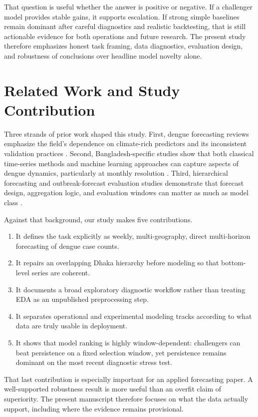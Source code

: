 \documentclass[11pt]{article}
\begin{document}
That question is useful whether the answer is positive or negative. If a challenger model provides stable gains, it supports escalation. If strong simple baselines remain dominant after careful diagnostics and realistic backtesting, that is still actionable evidence for both operations and future research. The present study therefore emphasizes honest task framing, data diagnostics, evaluation design, and robustness of conclusions over headline model novelty alone.

\section{Related Work and Study Contribution}
Three strands of prior work shaped this study. First, dengue forecasting reviews emphasize the field's dependence on climate-rich predictors and its inconsistent validation practices \citep{leung2023systematic}. Second, Bangladesh-specific studies show that both classical time-series methods and machine learning approaches can capture aspects of dengue dynamics, particularly at monthly resolution \citep{naher2022forecasting,liu2025comparative}. Third, hierarchical forecasting and outbreak-forecast evaluation studies demonstrate that forecast design, aggregation logic, and evaluation windows can matter as much as model class \citep{hyndman2011optimal,hyndman2021forecasting,cramer2022evaluation}.

Against that background, our study makes five contributions.
\begin{enumerate}
    \item It defines the task explicitly as weekly, multi-geography, direct multi-horizon forecasting of dengue case counts.
    \item It repairs an overlapping Dhaka hierarchy before modeling so that bottom-level series are coherent.
    \item It documents a broad exploratory diagnostic workflow rather than treating EDA as an unpublished preprocessing step.
    \item It separates operational and experimental modeling tracks according to what data are truly usable in deployment.
    \item It shows that model ranking is highly window-dependent: challengers can beat persistence on a fixed selection window, yet persistence remains dominant on the most recent diagnostic stress test.
\end{enumerate}

That last contribution is especially important for an applied forecasting paper. A well-supported robustness result is more useful than an overfit claim of superiority. The present manuscript therefore focuses on what the data actually support, including where the evidence remains provisional.
\end{document}

